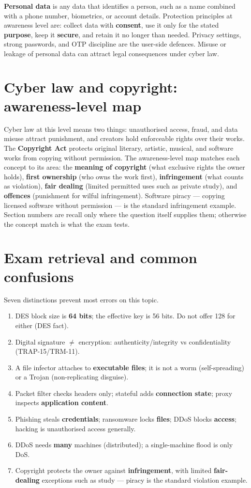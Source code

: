 \documentclass[11pt]{article}
\begin{document}
\textbf{Personal data} is any data that identifies a person, such as a name
combined with a phone number, biometrics, or account details. Protection
principles at awareness level are: collect data with \textbf{consent}, use it
only for the stated \textbf{purpose}, keep it \textbf{secure}, and retain it
no longer than needed. Privacy settings, strong passwords, and OTP discipline
are the user-side defences. Misuse or leakage of personal data can attract
legal consequences under cyber law.

\section{Cyber law and copyright: awareness-level map}
Cyber law at this level means two things: unauthorised access, fraud, and
data misuse attract punishment, and creators hold enforceable rights over
their works. The \textbf{Copyright Act} protects original literary, artistic,
musical, and software works from copying without permission. The
awareness-level map matches each concept to its area: the \textbf{meaning of
copyright} (what exclusive rights the owner holds), \textbf{first ownership}
(who owns the work first), \textbf{infringement} (what counts as violation),
\textbf{fair dealing} (limited permitted uses such as private study), and
\textbf{offences} (punishment for wilful infringement). Software piracy ---
copying licensed software without permission --- is the standard infringement
example. Section numbers are recall only where the question itself supplies
them; otherwise the concept match is what the exam tests.

\section{Exam retrieval and common confusions}
Seven distinctions prevent most errors on this topic.
\begin{enumerate}
  \item DES block size is \textbf{64 bits}; the effective key is 56 bits. Do
    not offer 128 for either (DES fact).
  \item Digital signature $\ne$ encryption: authenticity/integrity vs
    confidentiality (TRAP-15/TRM-11).
  \item A file infector attaches to \textbf{executable files}; it is not a
    worm (self-spreading) or a Trojan (non-replicating disguise).
  \item Packet filter checks headers only; stateful adds \textbf{connection
    state}; proxy inspects \textbf{application content}.
  \item Phishing steals \textbf{credentials}; ransomware locks \textbf{files};
    DDoS blocks \textbf{access}; hacking is unauthorised access generally.
  \item DDoS needs \textbf{many} machines (distributed); a single-machine
    flood is only DoS.
  \item Copyright protects the owner against \textbf{infringement}, with
    limited \textbf{fair-dealing} exceptions such as study --- piracy is the
    standard violation example.
\end{enumerate}
\end{document}
